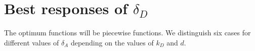 %
%
%
%
%
%
%

\section{Best responses of $\delta_{D}$}
The optimum functions will be piecewise functions. We distinguish six cases for different values of $\delta_{A}$ depending on the values of $k_{D}$ and $d$. 


